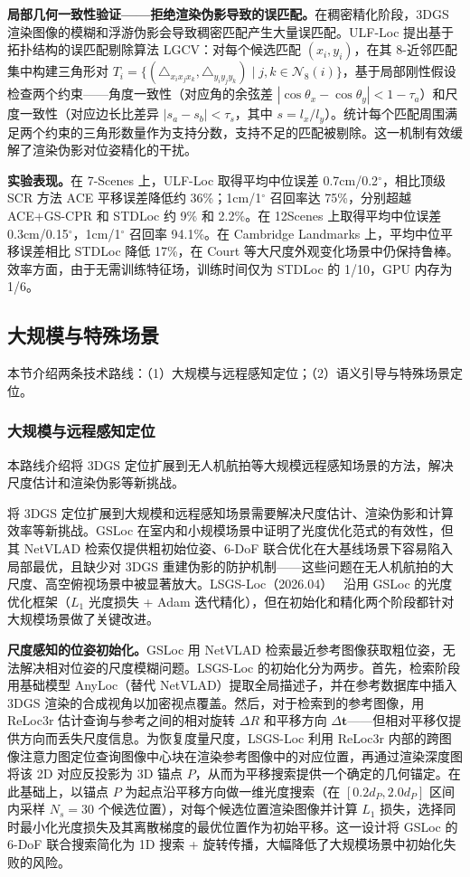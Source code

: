 \textbf{局部几何一致性验证——拒绝渲染伪影导致的误匹配。}在稠密精化阶段，3DGS 渲染图像的模糊和浮游伪影会导致稠密匹配产生大量误匹配。ULF-Loc 提出基于拓扑结构的误匹配剔除算法 LGCV：对每个候选匹配 $(x_i, y_i)$，在其 8-近邻匹配集中构建三角形对 $T_i = \{(\triangle_{x_i x_j x_k}, \triangle_{y_i y_j y_k}) \mid j, k \in \mathcal{N}_8(i)\}$，基于局部刚性假设检查两个约束——角度一致性（对应角的余弦差 $|\cos\theta_x - \cos\theta_y| < 1 - \tau_a$）和尺度一致性（对应边长比差异 $|s_a - s_b| < \tau_s$，其中 $s = l_x / l_y$）。统计每个匹配周围满足两个约束的三角形数量作为支持分数，支持不足的匹配被剔除。这一机制有效缓解了渲染伪影对位姿精化的干扰。

\textbf{实验表现。}在 7-Scenes 上，ULF-Loc 取得平均中位误差 0.7cm/0.2$^\circ$，相比顶级 SCR 方法 ACE 平移误差降低约 36\%；1cm/1$^\circ$ 召回率达 75\%，分别超越 ACE+GS-CPR 和 STDLoc 约 9\% 和 2.2\%。在 12Scenes 上取得平均中位误差 0.3cm/0.15$^\circ$，1cm/1$^\circ$ 召回率 94.1\%。在 Cambridge Landmarks 上，平均中位平移误差相比 STDLoc 降低 17\%，在 Court 等大尺度外观变化场景中仍保持鲁棒。效率方面，由于无需训练特征场，训练时间仅为 STDLoc 的 1/10，GPU 内存为 1/6。

\subsection{大规模与特殊场景}
\label{ss:15_7}

本节介绍两条技术路线：（1）大规模与远程感知定位；（2）语义引导与特殊场景定位。

\subsubsection{大规模与远程感知定位}

本路线介绍将 3DGS 定位扩展到无人机航拍等大规模远程感知场景的方法，解决尺度估计和渲染伪影等新挑战。

将 3DGS 定位扩展到大规模和远程感知场景需要解决尺度估计、渲染伪影和计算效率等新挑战。GSLoc 在室内和小规模场景中证明了光度优化范式的有效性，但其 NetVLAD 检索仅提供粗初始位姿、6-DoF 联合优化在大基线场景下容易陷入局部最优，且缺少对 3DGS 重建伪影的防护机制——这些问题在无人机航拍的大尺度、高空俯视场景中被显著放大。LSGS-Loc（2026.04）~\cite{2604_05402} 沿用 GSLoc 的光度优化框架（$L_1$ 光度损失 + Adam 迭代精化），但在初始化和精化两个阶段都针对大规模场景做了关键改进。

\textbf{尺度感知的位姿初始化。}GSLoc 用 NetVLAD 检索最近参考图像获取粗位姿，无法解决相对位姿的尺度模糊问题。LSGS-Loc 的初始化分为两步。首先，检索阶段用基础模型 AnyLoc（替代 NetVLAD）提取全局描述子，并在参考数据库中插入 3DGS 渲染的合成视角以加密视点覆盖。然后，对于检索到的参考图像，用 ReLoc3r 估计查询与参考之间的相对旋转 $\Delta R$ 和平移方向 $\Delta \mathbf{t}$——但相对平移仅提供方向而丢失尺度信息。为恢复度量尺度，LSGS-Loc 利用 ReLoc3r 内部的跨图像注意力图定位查询图像中心块在渲染参考图像中的对应位置，再通过渲染深度图将该 2D 对应反投影为 3D 锚点 $P$，从而为平移搜索提供一个确定的几何锚定。在此基础上，以锚点 $P$ 为起点沿平移方向做一维光度搜索（在 $[0.2 d_P, 2.0 d_P]$ 区间内采样 $N_s = 30$ 个候选位置），对每个候选位置渲染图像并计算 $L_1$ 损失，选择同时最小化光度损失及其离散梯度的最优位置作为初始平移。这一设计将 GSLoc 的 6-DoF 联合搜索简化为 1D 搜索 + 旋转传播，大幅降低了大规模场景中初始化失败的风险。

